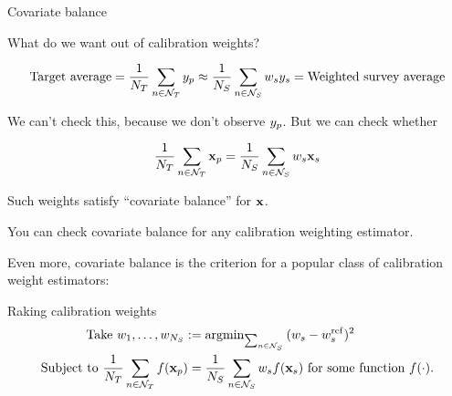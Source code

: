 
\begin{frame}[t]{Covariate balance}

What do we want out of calibration weights?

$$
\textrm{Target average} =
\frac{1}{N_{T}} \sum_{n \in \mathcal{N}_{T}} y_p \approx \frac{1}{N_{S}} \sum_{n \in \mathcal{N}_{S}} w_s y_s
= \textrm{Weighted survey average}
$$

We can't check this, because we don't observe $y_p$.  But we can check
whether

$$
    \frac{1}{N_{T}} \sum_{n \in \mathcal{N}_{T}} \mathbf{x}_p = \frac{1}{N_{S}} \sum_{n \in \mathcal{N}_{S}} w_s \mathbf{x}_s
$$

Such weights satisfy ``covariate balance'' for $\mathbf{x}$.

You can check covariate balance for any calibration weighting estimator.

Even more, covariate balance is the criterion for a popular class of calibration
weight estimators:

\begin{block}{Raking calibration weights}
$$
\begin{aligned}
    \textrm{ Take }
    w_1, \ldots, w_{N_{S}} :={}& \mathrm{argmin}_{\sum_{n \in \mathcal{N}_{S}}}\, (w_s - w_s^{\mathrm{ref}})^2 \\
    \textrm{Subject to }
    \frac{1}{N_{T}} \sum_{n \in \mathcal{N}_{T}} f(\mathbf{x}_p) ={}& \frac{1}{N_{S}} \sum_{n \in \mathcal{N}_{S}} w_s f(\mathbf{x}_s)
    \textrm{ for some function }f(\cdot).
\end{aligned}
$$
\end{block}



\end{frame}





